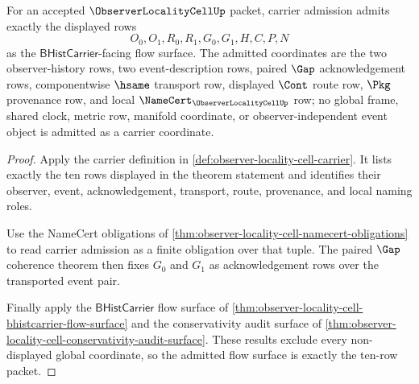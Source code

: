 \begin{theorem}
\label{thm:observer-locality-cell-obligation-carrier-admission}
For an accepted $\ObserverLocalityCellUp$ packet, carrier admission admits exactly the displayed rows
$$
O_0,O_1,R_0,R_1,G_0,G_1,H,C,P,N
$$
as the $\mathsf{BHistCarrier}$-facing flow surface. The admitted coordinates are the two observer-history rows, two event-description rows, paired $\Gap$ acknowledgement rows, componentwise $\hsame$ transport row, displayed $\Cont$ route row, $\Pkg$ provenance row, and local $\NameCert_{\ObserverLocalityCellUp}$ row; no global frame, shared clock, metric row, manifold coordinate, or observer-independent event object is admitted as a carrier coordinate.
\end{theorem}
\begin{proof}
Apply the carrier definition in \autoref{def:observer-locality-cell-carrier}. It lists exactly the ten rows displayed in the theorem statement and identifies their observer, event, acknowledgement, transport, route, provenance, and local naming roles.

Use the NameCert obligations of \autoref{thm:observer-locality-cell-namecert-obligations} to read carrier admission as a finite obligation over that tuple. The paired $\Gap$ coherence theorem then fixes $G_0$ and $G_1$ as acknowledgement rows over the transported event pair.

Finally apply the $\mathsf{BHistCarrier}$ flow surface of \autoref{thm:observer-locality-cell-bhistcarrier-flow-surface} and the conservativity audit surface of \autoref{thm:observer-locality-cell-conservativity-audit-surface}. These results exclude every non-displayed global coordinate, so the admitted flow surface is exactly the ten-row packet.
\end{proof}

